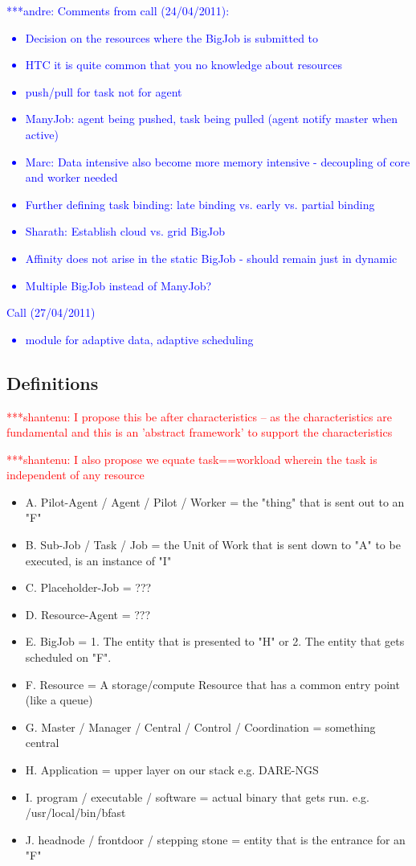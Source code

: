 \documentclass[]{article}
\newcommand{\jhanote}[1]{ {\textcolor{red} { ***shantenu: #1 }}}
\newcommand{\alnote}[1]{ {\textcolor{blue} { ***andre: #1 }}}
\newcommand{\alnote}[1]{}
\begin{document}
\alnote{Comments from call (24/04/2011):
\begin{itemize}
	\item Decision on the resources where the BigJob is submitted to
	\item HTC it is quite common that you no knowledge about resources
	\item push/pull for task not for agent
	\item ManyJob: agent being pushed, task being pulled (agent notify master when active)
	\item Marc: Data intensive also become more memory intensive - decoupling of core and worker needed
	\item Further defining task binding: late binding vs. early vs. partial binding	
	\item Sharath: Establish cloud vs. grid BigJob
	\item Affinity does not arise in the static BigJob - should remain just in dynamic
	\item Multiple BigJob instead of ManyJob?
\end{itemize}
Call (27/04/2011)
\begin{itemize}
	\item module for adaptive data, adaptive scheduling    
\end{itemize}
}


\subsection{Definitions}

\jhanote{I propose this be after characteristics -- as the
  characteristics are fundamental and this is an 'abstract
  framework' to support the characteristics}

\jhanote{I also propose we equate task==workload wherein the task is
  independent of any resource}

\begin{itemize}
	\item A. Pilot-Agent / Agent / Pilot / Worker = the "thing" that is sent out to an "F"
	\item B. Sub-Job / Task / Job = the Unit of Work that is sent down to "A" to be executed, is an instance of "I"
	\item C. Placeholder-Job = ???
	\item D. Resource-Agent = ???
	\item E. BigJob = 1. The entity that is presented to "H" or 2. The entity that gets scheduled on "F".
	\item F. Resource = A storage/compute Resource that has a common entry point (like a queue)
	\item G. Master / Manager / Central / Control / Coordination = something central
	\item H. Application = upper layer on our stack e.g. DARE-NGS
	\item I. program / executable / software = actual binary that gets run. e.g. /usr/local/bin/bfast
	\item J. headnode / frontdoor / stepping stone = entity that is the entrance for an "F"
\end{itemize}
\end{document}

